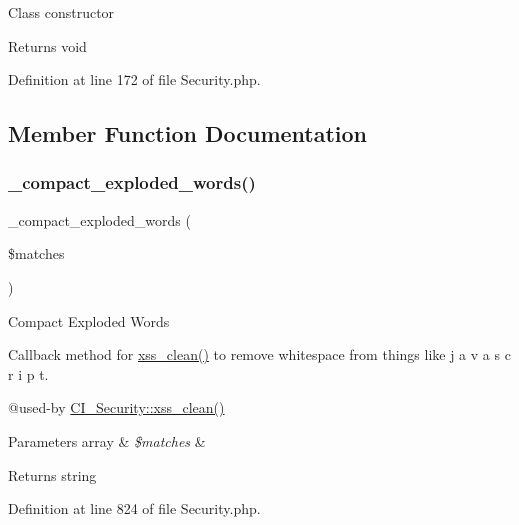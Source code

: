 Class constructor

\begin{DoxyReturn}{Returns}
void 
\end{DoxyReturn}


Definition at line 172 of file Security.\+php.



\subsection{Member Function Documentation}
\mbox{\label{class_c_i___security_adfb0e251ae35ae40303a302d253c3ab2}} 
\subsubsection{\texorpdfstring{\_compact\_exploded\_words()}{\_compact\_exploded\_words()}}
{\footnotesize\ttfamily \+\_\+compact\+\_\+exploded\+\_\+words (\begin{DoxyParamCaption}\item[{}]{\$matches }\end{DoxyParamCaption})\hspace{0.3cm}{\ttfamily [protected]}}

Compact Exploded Words

Callback method for \mbox{\hyperlink{class_c_i___security_acb759426dbab128d3d8164805225381c}{xss\+\_\+clean()}} to remove whitespace from things like \textquotesingle{}j a v a s c r i p t\textquotesingle{}.

@used-\/by \mbox{\hyperlink{class_c_i___security_acb759426dbab128d3d8164805225381c}{C\+I\+\_\+\+Security\+::xss\+\_\+clean()}} 
\begin{DoxyParams}[1]{Parameters}
array & {\em \$matches} & \\
\hline
\end{DoxyParams}
\begin{DoxyReturn}{Returns}
string 
\end{DoxyReturn}


Definition at line 824 of file Security.\+php.

\mbox{\label{class_c_i___security_ae16451bcdc769285c499cbf8068b3523}} 
